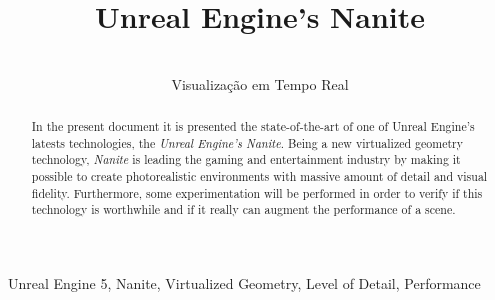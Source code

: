 \documentclass[10pt,journal,compsoc]{IEEEtran}
\begin{document}
\title{\textbf{Unreal Engine’s Nanite}\\ 
}





\author{ \\ Visualização em Tempo Real \\
}


\maketitle

\IEEEpubidadjcol

\begin{abstract}
In the present document it is presented the state-of-the-art of one of Unreal Engine's latests technologies, the \textit{Unreal Engine's Nanite}. Being a new virtualized geometry technology, \textit{Nanite} is leading the gaming and entertainment industry by making it possible to create photorealistic environments with massive amount of detail and visual fidelity. Furthermore, some experimentation will be performed in order to verify if this technology is worthwhile and if it really can augment the performance of a scene.
\end{abstract}

\begin{IEEEkeywords}
Unreal Engine 5, Nanite, Virtualized Geometry, Level of Detail, Performance
\end{IEEEkeywords}

\end{document}
